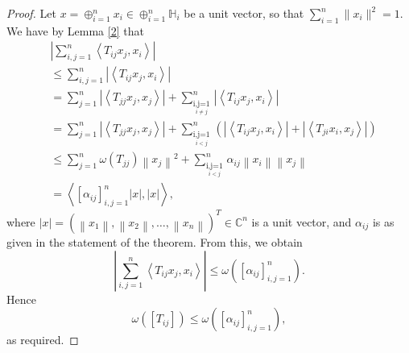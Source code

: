 \documentclass[12pt,twoside,reqno]{amsart}
\numberwithin{equation}{section}
\begin{document}
\begin{proof}
Let $x=\oplus_{i=1}^{n}x_i\in\oplus_{i=1}^{n}\mathbb{H}_i$ be a unit vector, so that $\sum_{i=1}^{n}\|x_i\|^2=1.$ We have by Lemma \ref{2} that
\[\begin{aligned}
  & \left| \sum\limits_{i,j=1}^{n}{\left\langle {{T}_{ij}}{{x}_{j}},{{x}_{i}} \right\rangle } \right| \\ 
 & \le \sum\limits_{i,j=1}^{n}{\left| \left\langle {{T}_{ij}}{{x}_{j}},{{x}_{i}} \right\rangle  \right|} \\ 
 & = \sum\limits_{j=1}^{n}{\left| \left\langle {{T}_{jj}}{{x}_{j}},{{x}_{j}} \right\rangle  \right|}+\sum\limits_{\underset{i\ne j}{\mathop{i,j=1}}\,}^{n}{\left| \left\langle {{T}_{ij}}{{x}_{j}},{{x}_{i}} \right\rangle  \right|} \\ 
 & =\sum\limits_{j=1}^{n}{\left| \left\langle {{T}_{jj}}{{x}_{j}},{{x}_{j}} \right\rangle  \right|}+\sum\limits_{\underset{i<j}{\mathop{i,j=1}}\,}^{n}\left({\left| \left\langle {{T}_{ij}}{{x}_{j}},{{x}_{i}} \right\rangle  \right|+\left| \left\langle {{T}_{ji}}{{x}_{i}},{{x}_{j}} \right\rangle  \right|}\right) \\ 
 & \le \sum\limits_{j=1}^{n}{\omega \left( {{T}_{jj}} \right){{\left\| {{x}_{j}} \right\|}^{2}}}+\sum\limits_{\underset{i<j}{\mathop{i,j=1}}\,}^{n}{{{\alpha }_{ij}}\left\| {{x}_{i}} \right\|\left\| {{x}_{j}} \right\|} \\ 
 & =\left\langle \left[ {{\alpha }_{ij}} \right]_{i,j=1}^{n}\left| x \right|,\left| x \right| \right\rangle,
\end{aligned}\]
where $\left| x \right|={{\left( \left\| {{x}_{1}} \right\|,\left\| {{x}_{2}} \right\|,\ldots ,\left\| {{x}_{n}} \right\| \right)}^{T}}\in {{\mathbb{C}}^{n}}$ is a unit vector, and $\alpha_{ij}$ is as given in the statement of the theorem. From this, we obtain
\[\left| \sum\limits_{i,j=1}^{n}{\left\langle {{T}_{ij}}{{x}_{j}},{{x}_{i}} \right\rangle } \right|\le \omega \left( \left[ {{\alpha }_{ij}} \right]_{i,j=1}^{n} \right).\] Hence 
\[\omega \left( \left[ {{T}_{ij}} \right] \right)\le \omega \left( \left[ {{\alpha }_{ij}} \right]_{i,j=1}^{n} \right),\]
as required.
\end{proof}
\end{document}
